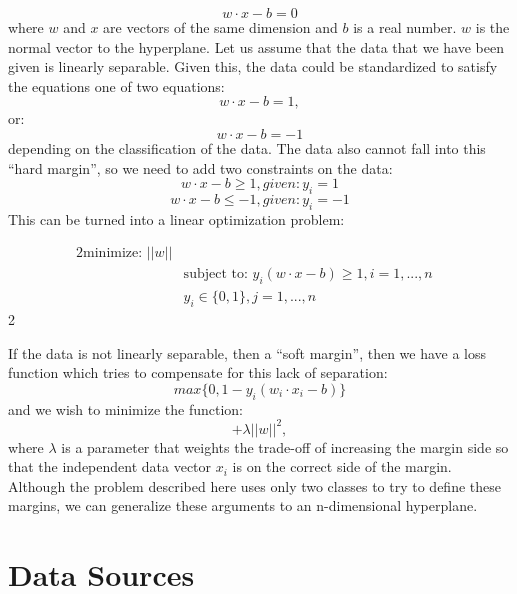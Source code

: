 \documentclass[titlepage, 12pt]{article}
\begin{document}
\begin{equation}
    w\cdot x - b = 0
\end{equation}
where $w$ and $x$ are vectors of the same dimension and $b$ is a real number. $w$ is the normal vector to the hyperplane. Let us assume that the data that we have been given is linearly separable. Given this, the data could be standardized to satisfy the equations one of two equations:
\begin{equation}
    w \cdot x - b = 1, 
\end{equation}
or:
\begin{equation}
    w \cdot x - b = -1
\end{equation}
depending on the classification of the data. The data also cannot fall into this ``hard margin'', so we need to add two constraints on the data:
\begin{equation}
    w \cdot x - b \geq 1, given: y_i = 1
\end{equation}
\begin{equation}
     w \cdot x - b \leq -1, given: y_i = -1
\end{equation}
This can be turned into a linear optimization problem:

\begin{alignat*}{2}
 \text{minimize: }  ||w||  &\\
  &\text{subject to: } \displaystyle y_i(w \cdot x - b) \geq 1, i=1 ,..., n &\\
        &y_{i} \in \{0,1\}, j=1 ,..., n
\end{alignat*}{2}

If the data is not linearly separable, then a ``soft margin'', then we have a loss function which tries to compensate for this lack of separation:
\begin{equation}
    max\{0, 1 - y_i(w_i \cdot x_i - b)\}
\end{equation}
and we wish to minimize the function:
\begin{equation}
    [\frac{1}{n}\sum_{i=1}^{n} max\{0, 1 - y_i(w_i \cdot x_i - b)\}]+\lambda||w||^2,
\end{equation}
where $\lambda$ is a parameter that weights the trade-off of increasing the margin side so that the independent data vector $x_i$ is on the correct side of the margin. Although the problem described here uses only two classes to try to define these margins, we can generalize these arguments to an n-dimensional hyperplane.

\section{Data Sources}
\end{document}
